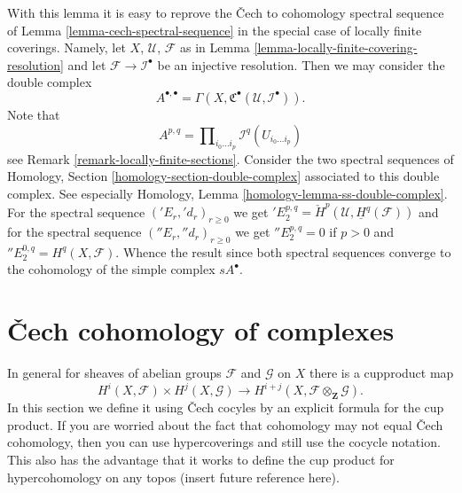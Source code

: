 \noindent
With this lemma it is easy to reprove the {\v C}ech to cohomology spectral
sequence of Lemma \ref{lemma-cech-spectral-sequence} in the special
case of locally finite coverings. Namely,
let $X$, $\mathcal{U}$, $\mathcal{F}$ as in
Lemma \ref{lemma-locally-finite-covering-resolution}
and let $\mathcal{F} \to \mathcal{I}^\bullet$ be an injective resolution.
Then we may consider the double complex
$$
A^{\bullet, \bullet} =
\Gamma(X, {\mathfrak C}^\bullet(\mathcal{U}, \mathcal{I}^\bullet)).
$$
Note that
$$
A^{p, q} = \prod\nolimits_{i_0 \ldots i_p} \mathcal{I}^q(U_{i_0 \ldots i_p})
$$
see Remark \ref{remark-locally-finite-sections}.
Consider the two spectral sequences of
Homology, Section \ref{homology-section-double-complex} associated
to this double complex.
See especially Homology, Lemma \ref{homology-lemma-ss-double-complex}.
For the spectral sequence $({}'E_r, {}'d_r)_{r \geq 0}$
we get ${}'E_2^{p, q} = \check{H}^p(\mathcal{U}, \underline{H}^q(\mathcal{F}))$
and for the spectral sequence $({}''E_r, {}''d_r)_{r \geq 0}$ we get
${}''E_2^{p, q} = 0$ if $p > 0$ and ${}''E_2^{0, q} = H^q(X, \mathcal{F})$.
Whence the result since both spectral sequences converge to the
cohomology of the simple complex $sA^\bullet$.












\section{{\v C}ech cohomology of complexes}
\label{section-cech-cohomology-of-complexes}

\noindent
In general for sheaves of abelian groups
${\mathcal F}$ and ${\mathcal G}$ on $X$ there is a cupproduct map
$$
H^i(X, {\mathcal F}) \times H^j(X, {\mathcal G})
\longrightarrow
H^{i + j}(X, {\mathcal F} \otimes_{\mathbf Z} {\mathcal G}).
$$
In this section we define it using {\v C}ech cocyles by an explicit formula
for the cup product. If you are worried about the fact that cohomology may not
equal {\v C}ech cohomology, then you can use hypercoverings and still
use the cocycle notation. This also has the advantage that
it works to define the cup product for hypercohomology on any topos (insert
future reference here).

